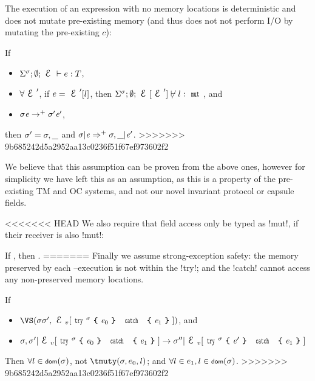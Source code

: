 \begin{Assumption}
\begin{Assumption}
The execution of an expression
with no \Q@mut@ memory locations is deterministic and does not
mutate pre-existing memory (and thus does not not perform I/O by mutating the pre-existing $c$):
\begin{Assumption}[Determinism]\rm If
	\SS[0.25]\begin{itemize}
	\item $\tyr{e}{T}$,
	\item $\forall \E'$, if $e = \E'[l]$, then $\ntyr[\E']{l}{\Kw{mut}}$, and
	\item $\sigma{\ensuremath{\mathit{e}}} \rightarrow^+ \sigma'{\mathit{e}}'$,
	\end{itemize}\SS[0.25]
then $\sigma' = \sigma,\_$ and $\sigma | {\mathit{e}} \Rightarrow^+ \sigma,\_ | {\mathit{e}}'$.
>>>>>>> 9b685242d5a2952aa13c0236f51f67ef973602f2
\end{Assumption}
We believe that this assumption can be proven from the above ones, however for simplicity we have left this as an assumption, as this is a property of the pre-existing TM and OC systems, and not our novel invariant protocol or capsule fields.

<<<<<<< HEAD
\noindent We also require that field access only be typed as \Q!mut!, if their receiver is also \Q!mut!:%
\SS\begin{Assumption}\rm If , then .
=======
Finally we assume strong-exception safety: the memory preserved by each \Q@try@--\Q@catch@ execution is not \tmuty within the \Q!try!; and the \Q!catch! cannot access any non-preserved memory locations.
\begin{Assumption}\rm
If
	\SS[0.25]\begin{itemize}
	\item $\VS(\s\s', \EV[\Kw{try}^\sigma\oC\e_0\cC\ \Kw{catch}\ \oC\e_1\cC])$, and 
	\item $
	\sigma,\sigma'|\EV[\Kw{try}^\sigma\oC\e_0\cC\ \Kw{catch}\ \oC\e_1\cC]\rightarrow 
	\sigma''|\EV[\Kw{try}^\sigma\oC\e'\cC\ \Kw{catch}\ \oC\e_1\cC]
	$
	\end{itemize}\SS[0.25]
Then $\forall l \in \dom(\s)$, not $\tmuty(\s, e_0, l)$; and $\forall l \in e_1, l \in \dom(\s)$.
>>>>>>> 9b685242d5a2952aa13c0236f51f67ef973602f2
\end{Assumption}


\end{Assumption}
\end{Assumption}
\end{Assumption}
